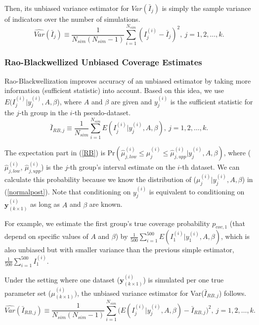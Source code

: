 \documentclass[article]{jss}
\begin{document}
Then, its unbiased variance estimator  for $Var(\bar{I}_{j})$ is simply the sample variance of indicators over the number of simulations.
\begin{equation}
\widehat{Var}(\bar{I}_{j})\equiv\frac{1}{N_{sim}(N_{sim}-1)}\sum_{i=1}^{N_{sim}}(I^{(i)}_{j}-\bar{I}_{j})^{2},~ j=1, 2, \ldots, k.
\end{equation}


\subsubsection{Rao-Blackwellized Unbiased Coverage Estimates}
Rao-Blackwellization improves accuracy of an unbiased estimator by taking more information (sufficient statistic) into account. Based on this idea, we use $E(I^{(i)}_{j}\vert y^{(i)}_{j}, A, \beta$), where $A$ and $\beta$ are given and $y^{(i)}_{j}$ is the sufficient statistic for the $j$-th group in the $i$-th pseudo-dataset. 
\begin{equation}\label{RB}
\bar{I}_{RB, j}\equiv \frac{1}{N_{sim}}\sum_{i=1}^{N_{sim}}E(I^{(i)}_{j}\vert y^{(i)}_{j}, A, \beta),~ j=1, 2, \ldots, k.
\end{equation}

The expectation part in (\ref{RB}) is Pr$(\hat{\mu}^{(i)}_{j, low}\le \mu^{(i)}_{j} \le\hat{\mu}^{(i)}_{j, upp}\vert y^{(i)}_{j}, A, \beta)$, where ($\hat{\mu}^{(i)}_{j, low}$, $\hat{\mu}^{(i)}_{j, upp}$) is the $j$-th group's interval estimate on the $i$-th dataset. We can calculate this probability  because we know the distribution of ($\mu^{(i)}_{j} \vert y^{(i)}_{j}, A, \beta$) in (\ref{normalpost}). Note that conditioning on $y^{(i)}_{j}$ is equivalent to conditioning on $\mathbf{y}^{(i)}_{(k\times1)}$ as long as $A$ and $\beta$ are known. 

For example, we estimate the first group's true coverage probability $p_{cov, 1}$ (that depend on specific values of $A$ and $\beta$) by $\frac{1}{500}\sum_{i=1}^{500}E(I^{(i)}_{1}\vert y^{(i)}_{1}, A, \beta)$, which is also unbiased but with smaller variance than the previous simple estimator, $\frac{1}{500}\sum_{i=1}^{500}I^{(i)}_{1}$.

Under the setting where one dataset ($\mathbf{y}^{(i)}_{(k\times1)}$) is simulated per one true parameter set ({\boldmath $\mu$}$^{(i)}_{(k\times1)})$, the unbiased variance estimator for Var($\bar{I}_{RB, j}$) follows.
\begin{equation}
\widehat{Var}(\bar{I}_{RB, j})\equiv\frac{1}{N_{sim}(N_{sim}-1)}\sum_{i=1}^{N_{sim}}\bigg(E(I^{(i)}_{j}\vert y^{(i)}_{j}, A, \beta)-\bar{I}_{RB, j}\bigg)^{2},~ j=1, 2, \ldots, k.
\end{equation}
\end{document}

